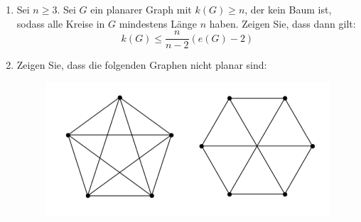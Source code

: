 \begin{assignment}
 \begin{enumerate}[label=(\alph*)] 
    \item Sei $n \geq 3$. Sei $ G $ ein planarer Graph mit $k(G) \geq n$, der kein Baum ist, sodass alle Kreise in $ G $ mindestens Länge $ n $ haben. Zeigen Sie, dass dann gilt:
    \begin{equation*}
      k(G) \leq \frac{n}{n-2}(e(G) - 2)
    \end{equation*}
    \item Zeigen Sie, dass die folgenden Graphen nicht planar sind:    
    \begin{figure}[H]
        \centering
        \includegraphics[width=\linewidth]{assets/images/Abb1-15-12-assignment.png}
    \end{figure}
  \end{enumerate} 
\end{assignment}
